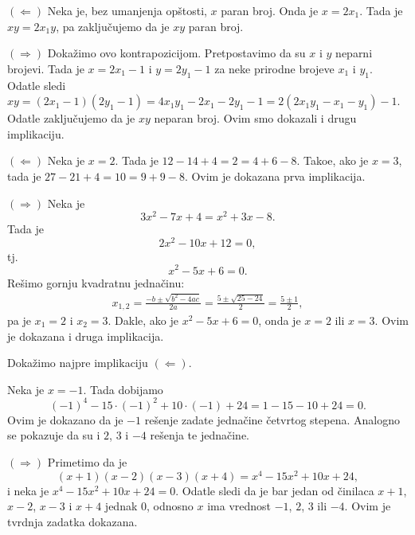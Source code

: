 %


$(\Leftarrow)$ Neka je, bez umanjenja op\v stosti, $x$ paran broj. Onda je $x=2x_1$. Tada je $xy=2x_1y$, pa zaklju\v cujemo da je $xy$ paran broj.

$(\Rightarrow)$ Doka\v zimo ovo kontrapozicijom. Pretpostavimo da su $x$ i $y$ neparni brojevi. Tada je $x=2x_1-1$ i $y=2y_1-1$ za neke prirodne brojeve $x_1$ i $y_1$. Odatle sledi $xy=(2x_1-1)(2y_1-1)=4x_1y_1-2x_1-2y_1-1=2(2x_1y_1-x_1-y_1)-1$. Odatle zaklju\v cujemo da je $xy$ neparan broj. Ovim smo dokazali i drugu implikaciju.

$(\Leftarrow)$ Neka je $x=2$. Tada je $12-14+4=2=4+6-8$. Tako\dj e, ako je $x=3$, tada je $27-21+4=10=9+9-8$. Ovim je dokazana prva implikacija.

$(\Rightarrow)$ Neka je 
\[3x^2-7x+4=x^2+3x-8.\]
Tada je
\[2x^2-10x+12=0,\]
tj.
\[x^2-5x+6=0.\]
%
Re\v simo gornju kvadratnu jedna\v cinu:
\begin{align*}
x_{1,2}=\frac{-b\pm\sqrt{b^2-4ac}}{2a}=\frac{5\pm\sqrt{25-24}}2=\frac{5\pm 1}2,
\end{align*}
pa je $x_1=2$ i $x_2=3$. Dakle, ako je $x^2-5x+6=0$, onda je $x=2$ ili $x=3$. Ovim je dokazana i druga implikacija.


Doka\v zimo najpre implikaciju $(\Leftarrow)$.

Neka je $x=-1$. Tada dobijamo
\[(-1)^4-15\cdot(-1)^2+10\cdot(-1)+24=1-15-10+24=0.\]
Ovim je dokazano da je $-1$ re\v senje zadate jedna\v cine \v cetvrtog stepena. Analogno se pokazuje da su i $2$, $3$ i $-4$ re\v senja te jedna\v cine.

$(\Rightarrow)$ Primetimo da je
\[(x+1)(x-2)(x-3)(x+4)=x^4-15x^2+10x+24,\]
i neka je $x^4-15x^2+10x+24=0$. Odatle sledi da je bar jedan od \v cinilaca $x+1$, $x-2$, $x-3$ i $x+4$ jednak $0$, odnosno $x$ ima vrednost $-1$, $2$, $3$ ili $-4$. Ovim je tvrdnja zadatka dokazana.
%

